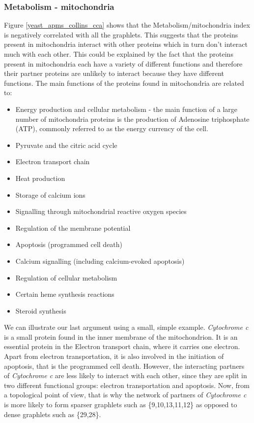 \subsubsection{Metabolism - mitochondria}
Figure \ref{yeast_apms_collins_cca} shows that the Metabolism/mitochondria index is negatively correlated with all the graphlets. This suggests that the proteins present in mitochondria interact with other proteins which in turn don't interact much with each other. This could be explained by the fact that the proteins present in mitochondria each have a variety of different functions and therefore their partner proteins are unlikely to interact because they have different functions. The main functions of the proteins found in mitochondria are related to:
\begin{itemize}
 \item Energy production and cellular metabolism - the main function of a large number of mitochondria proteins is the production of Adenosine triphosphate (ATP), commonly referred to as the energy currency of the cell. \cite{voet1999fundamentals}
 \item Pyruvate and the citric acid cycle \cite{voet1999fundamentals}
 \item Electron transport chain \cite{voet1999fundamentals}
 \item Heat production \cite{voet1999fundamentals}
 \item Storage of calcium ions \cite{siegel1999basic}
 \item Signalling through mitochondrial reactive oxygen species \cite{li2013targeting}
 \item Regulation of the membrane potential \cite{voet1999fundamentals}
 \item Apoptosis (programmed cell death) \cite{green1998apoptotic}
 \item Calcium signalling (including calcium-evoked apoptosis) \cite{hajnoczky2006mitochondrial}
 \item Regulation of cellular metabolism \cite{mcbride2006mitochondria}
 \item Certain heme synthesis reactions \cite{oh1997evolutionary}
 \item Steroid synthesis \cite{rossier2006t}
\end{itemize}

We can illustrate our last argument using a small, simple example. \emph{Cytochrome c} is a small protein found in the inner membrane of the mitochondrion. It is an essential protein in the Electron transport chain, where it carries one electron. Apart from electron transportation, it is also involved in the initiation of apoptosis, that is the programmed cell death. However, the interacting partners of \emph{Cytochrome c} are less likely to interact with each other, since they are split in two different functional groups: electron transportation and apoptosis. Now, from a topological point of view, that is why the network of partners of \emph{Cytochrome c} is more likely to form sparser graphlets such as \{9,10,13,11,12\} as opposed to dense graphlets such as \{29,28\}.


